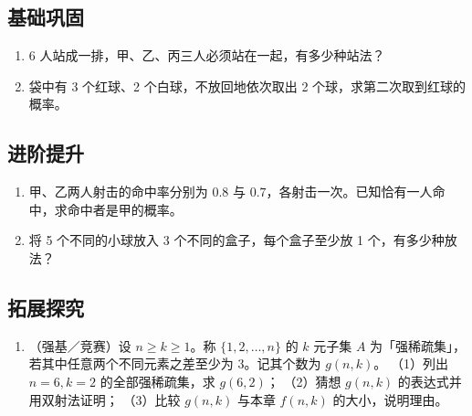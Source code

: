 \begin{afterclass}
\subsection*{基础巩固}
\begin{enumerate}
  \item 6 人站成一排，甲、乙、丙三人必须站在一起，有多少种站法？
  \item 袋中有 3 个红球、2 个白球，不放回地依次取出 2 个球，求第二次取到红球的概率。
\end{enumerate}

\subsection*{进阶提升}
\begin{enumerate}
  \item 甲、乙两人射击的命中率分别为 $0.8$ 与 $0.7$，各射击一次。已知恰有一人命中，求命中者是甲的概率。
  \item 将 5 个不同的小球放入 3 个不同的盒子，每个盒子至少放 1 个，有多少种放法？
\end{enumerate}

\subsection*{拓展探究}
\begin{enumerate}
  \item （强基／竞赛）设 $n\ge k\ge1$。称 $\{1,2,\dots,n\}$ 的 $k$ 元子集 $A$ 为「强稀疏集」，若其中任意两个不同元素之差至少为 $3$。记其个数为 $g(n,k)$。
  （1）列出 $n=6,k=2$ 的全部强稀疏集，求 $g(6,2)$；
  （2）猜想 $g(n,k)$ 的表达式并用双射法证明；
  （3）比较 $g(n,k)$ 与本章 $f(n,k)$ 的大小，说明理由。
\end{enumerate}


\end{afterclass}
